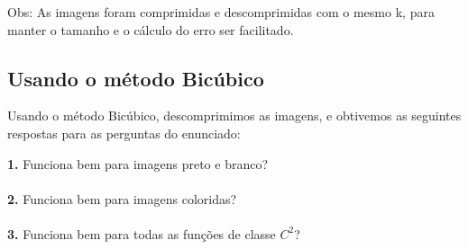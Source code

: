 \documentclass[12pt,letterpaper]{article}
\begin{document}
	\begin{figure}[h]
	\end{figure}
	
	Obs: As imagens foram comprimidas e descomprimidas com o mesmo k, para manter o tamanho e o cálculo do erro ser facilitado.
	
	\clearpage
	
	\subsection{Usando o método Bicúbico}

	Usando o método Bicúbico, descomprimimos as imagens, e obtivemos as seguintes respostas para as perguntas do enunciado:
	
	
	\textbf{1.} Funciona bem para imagens preto e branco?\\
	\\
	
	\textbf{2.} Funciona bem para imagens coloridas?\\
	\\
	
	\textbf{3.} Funciona bem para todas as funções de classe $C^2$?\\
	\\
	
\end{document}
